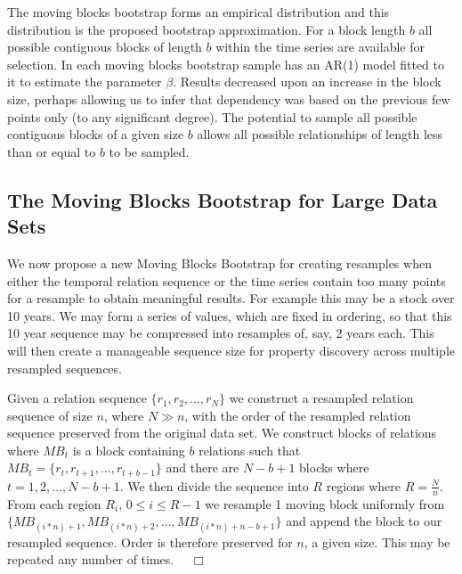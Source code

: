The moving blocks bootstrap forms an empirical distribution and this
distribution is the proposed bootstrap approximation. For a block
length $b$ all possible contiguous blocks of length $b$ within the
time series are available for selection. In \cite{et93} each moving
blocks bootstrap sample has an AR(1) model fitted to it to estimate
the parameter $\beta$. Results decreased upon an increase in the block
size, perhaps allowing us to infer that dependency was based on the
previous few points only (to any significant degree). The potential to
sample all possible contiguous blocks of a given size $b$ allows all
possible relationships of length less than or equal to $b$ to be sampled.


\subsection{The Moving Blocks Bootstrap for Large Data Sets}\label{subsec:tr_vlmbb}


We now propose a new Moving Blocks Bootstrap for creating resamples
when either the temporal relation sequence or the time series contain
too many points for a resample to obtain meaningful results. For
example this may be a stock over 10 years. We may form a series of
values, which are fixed in ordering, so that this 10 year sequence may
be compressed into resamples of, say, 2 years each. This will then create a
manageable sequence size for property discovery across multiple
resampled sequences.

\begin{definition}\label{def:vlmbb}
\begin{rm}
Given a relation sequence $\{ r_1, r_2, \ldots, r_N \}$ we construct a
resampled relation sequence of size $n$, where $N \gg n$, with the
order of the resampled relation sequence preserved from the original
data set.
We construct blocks of relations where $MB_t$ is a block containing
$b$ relations such that $MB_t = \{ r_t, r_{t+1}, \ldots, r_{t+b-1} \}$
and there are $N - b+ 1$ blocks where $t = 1, 2, \ldots, N-b+1$. 
We then divide the sequence into $R$ regions where $R = \frac{N}{n}$.
From each region $R_i$, $0 \le i \le R-1$ we resample 1 moving block
uniformly from $\{ MB_{(i*n)+1}, MB_{(i*n)+2}, \ldots,
MB_{(i*n)+n-b+1} \}$ and append 
the block to our resampled sequence. Order is therefore preserved for
$n$, a given 
size. This may be repeated any number of times. $\quad\Box$
\end{rm}
\end{definition}

